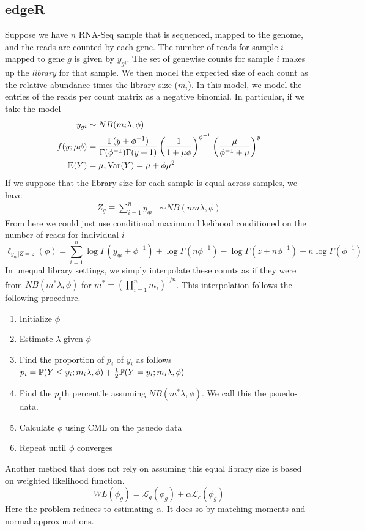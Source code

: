 \documentclass[11pt]{article}
\begin{document}
\subsection{edgeR}
Suppose we have $n$ RNA-Seq sample that is sequenced, mapped to the genome, and the reads are counted by each gene. The number of reads for sample $i$ mapped to gene $g$ is given by $y_{gi}$. The set of genewise counts for sample $i$ makes up the \textit{library} for that sample. We then model the expected size of each count as the relative abundance times the library size ($m_i$). In this model, we model the entries of the reads per count matrix as a negative binomial. In particular, if we take the model 
\begin{align*}
	y_{gi}&\sim NB(m_i\lambda, \phi)\\
	f(y;\mu\phi) &= \frac{\Gamma(y+\phi^{-1})}{\Gamma(\phi^{-1})\Gamma(y+1)}\left(\frac{1}{1+\mu\phi}\right)^{\phi^{-1}}\left(\frac{\mu}{\phi^{-1}+\mu}\right)^{y}\\
	{\mathbb{E}}(Y) &= \mu, {\text{Var}}(Y) = \mu + \phi\mu^2
\end{align*}
If we suppose that the library size for each sample is equal across samples, we have 
\begin{align*}
	Z_g\equiv \sum_{i=1}^ny_{gi}&\sim NB(mn\lambda, \phi)
\end{align*}
From here we could just use conditional maximum likelihood conditioned on the number of reads for individual $i$
\begin{equation}
	\ell_{y_{gi}|Z = z}(\phi) = \sum_{i=1}^n\log\Gamma(y_{gi}+\phi^{-1}) + \log\Gamma(n\phi^{-1})-\log\Gamma(z+n\phi^{-1})-n\log\Gamma(\phi^{-1})
\end{equation}
In unequal library settings, we simply interpolate these counts as if they were from $NB(m^{*}\lambda, \phi)$ for $m^{*} =\left(\prod_{i=1}^nm_i\right)^{1/n}$. This interpolation follows the following procedure. 
\begin{enumerate}
	\item Initialize $\phi$
	\item Estimate $\lambda$ given $\phi$
	\item Find the proportion of $p_i$ of $y_i$ as follows $p_i = {\mathbb{P}}(Y\leq y_i; m_i\lambda, \phi)+\frac{1}{2}{\mathbb{P}}(Y=y_i; m_i\lambda, \phi)$ 
	\item Find the $p_{i}$th percentile assuming $NB(m^{*}\lambda, \phi)$. We call this the psuedo-data.
	\item Calculate $\phi$ using CML on the psuedo data
	\item Repeat until $\phi$ converges
\end{enumerate}
Another method that does not rely on assuming this equal library size is based on weighted likelihood function. 
\begin{equation}
	WL(\phi_{g}) = \mathcal{L}_g(\phi_g) + \alpha\mathcal{L}_c(\phi_g)
\end{equation}
Here the problem reduces to estimating $\alpha$. It does so by matching moments and normal approximations. 
\end{document}
